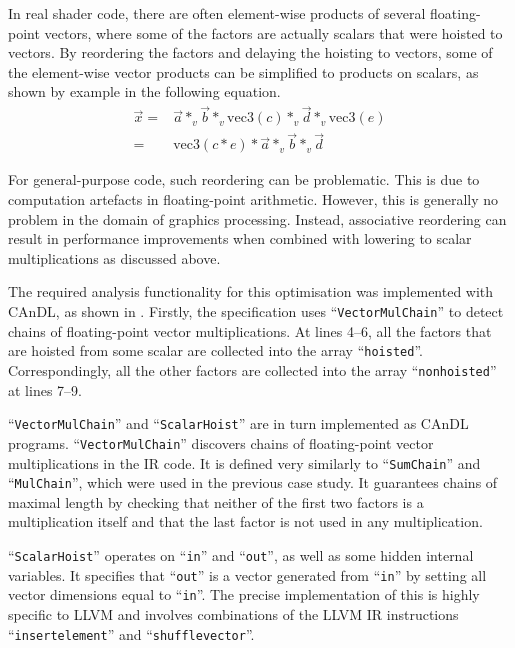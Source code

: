     In real shader code, there are often element-wise products of several
    floating-point vectors, where some of the factors are actually scalars
    that were hoisted to vectors.
    By reordering the factors and delaying the hoisting to vectors, some of the
    element-wise vector products can be simplified to products on scalars, as
    shown by example in the following equation.
    \begin{align*}
        \vec x={}&\vec a*_v\vec b*_v\text{vec3}(c)*_v\vec d*_v\text{vec3}(e)\\
        ={}&\text{vec3}(c*e)*\vec a*_v\vec b*_v\vec d
    \end{align*}

    For general-purpose code, such reordering can be problematic.
    This is due to computation artefacts in floating-point arithmetic.
    However, this is generally no problem in the domain of graphics processing.
    Instead, associative reordering can result in performance improvements
    when combined with lowering to scalar multiplications as discussed above.

    The required analysis functionality for this optimisation was implemented
    with CAnDL, as shown in .
    Firstly, the specification uses ``{\tt VectorMulChain}'' to detect chains of
    floating-point vector multiplications.
    At lines 4--6, all the factors that are hoisted from some scalar are
    collected into the array ``{\tt hoisted}''.
    Correspondingly, all the other factors are collected into the array
    ``{\tt nonhoisted}'' at lines 7--9.

    ``{\tt VectorMulChain}'' and ``{\tt ScalarHoist}'' are in turn implemented
    as CAnDL programs.
    ``{\tt VectorMulChain}'' discovers chains of floating-point vector
    multiplications in the IR code.
    It is defined very similarly to ``{\tt SumChain}'' and ``{\tt MulChain}'',
    which were used in the previous case study.
    It guarantees chains of maximal length by checking that neither of the first
    two factors is a multiplication itself and that the last factor is not used
    in any multiplication.

    ``{\tt ScalarHoist}'' operates on ``{\tt in}'' and ``{\tt out}'', as well
    as some hidden internal variables.
    It specifies that ``{\tt out}'' is a vector generated from ``{\tt in}'' by
    setting all vector dimensions equal to ``{\tt in}''.
    The precise implementation of this is highly specific to LLVM and involves
    combinations of the LLVM IR instructions ``{\tt insertelement}'' and
    ``{\tt shufflevector}''.

